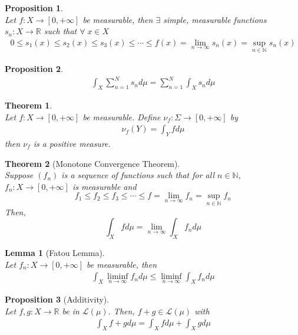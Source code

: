 \documentclass[10pt,a4paper]{article}
\newtheorem{theorem}{Theorem}
\newtheorem{lemma}{Lemma}
\newtheorem{proposition}{Proposition}
\theoremstyle{definition}
\theoremstyle{definition}
\numberwithin{equation}{section}
\numberwithin{theorem}{section}
\numberwithin{proposition}{section}
\numberwithin{lemma}{section}
\numberwithin{corollary}{section}
\begin{document}
\begin{proposition}$ $
\\Let $f: X \to [0, +\infty]$ be measurable, then $\exists$ simple, measurable functions $s_n: X \to \mathbb{R}$ such that $\forall \; x \in X$
\begin{align*}
0 \leq s_1(x) \leq s_2(x) \leq s_3(x) \leq \cdots \leq f(x) = \lim_{n \to \infty} s_n(x) = \sup_{n \in \mathbb{N}} s_n(x)
\end{align*}
\end{proposition}

\begin{proposition}$ $
\begin{align*}
\int_X \sum_{n = 1}^N s_n d \mu = \sum_{n = 1}^N \int_X s_n d \mu
\end{align*}
\end{proposition}

\begin{theorem}$ $
\\Let $f: X \to [0, +\infty]$ be measurable. Define $\nu_f : \Sigma \to [0, +\infty]$ by
\begin{align*}
\nu_f(Y) = \int_Y f d \mu
\end{align*}
then $\nu_f$ is a positive measure. 
\end{theorem}

\begin{theorem}[Monotone Convergence Theorem]$ $
\\Suppose $(f_n)$ is a sequence of functions such that for all $n \in \mathbb{N}$, $f_n: X \to [0, +\infty]$ is measurable and $$f_1 \leq f_2 \leq f_3 \leq \cdots \leq f = \lim_{n \to \infty} f_n = \sup_{n \in \mathbb{N}} f_n$$ Then, $$\int_X f d\mu = \lim_{n \to \infty} \int_X f_n d\mu$$
\end{theorem}

\begin{lemma}[Fatou Lemma]$ $
\\Let $f_n : X \to [0, +\infty]$ be measurable, then
\begin{align*}
\int_X \liminf_{n \to \infty} f_n d\mu \leq \liminf_{n \to \infty} \int_X f_n d\mu
\end{align*}
\end{lemma}

\begin{proposition}[Additivity]$ $
\\Let $f, g: X \to \mathbb{R}$ be in $\mathcal{L}(\mu)$. Then, $f + g \in \mathcal{L}(\mu)$ with 
\begin{align*}
\int_X f + g d\mu = \int_X f d\mu + \int_X g d\mu
\end{align*}
\end{proposition}
\end{document}
